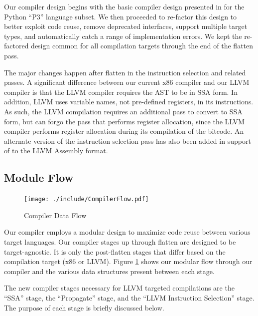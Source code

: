 \documentclass[11pt,twocolumn]{article}
\begin{document}
Our compiler design begins with the basic compiler design presented in
\cite{siek-chang} for the Python ``P3'' language subset.  We then
proceeded to re-factor this design to better exploit code reuse,
remove deprecated interfaces, support multiple target types, and
automatically catch a range of implementation errors. We kept the re-factored design common for all compilation targets
through the end of the flatten pass.

The major changes happen after flatten in the instruction selection
and related passes. A significant difference between our current x86
compiler and our LLVM compiler is that the LLVM compiler requires the
AST to be in SSA form. In addition, LLVM uses variable names, not
pre-defined registers, in its instructions. As such, the LLVM
compilation requires an additional pass to convert to SSA form, but
can forgo the pass that performs register allocation, since the LLVM compiler performs register allocation during its compilation of the bitcode. An alternate version of the instruction selection pass has also been added in support of to the LLVM Assembly format.

\subsection{Module Flow}
\label{sec:ModuleFlow}

\begin{figure}[htb]
   \centering
   \texttt{[image: ./include/CompilerFlow.pdf]}
   \caption{Compiler Data Flow}
   \label{fig:CompilerFlow}
\end{figure}

Our compiler employs a modular design to maximize code reuse between
various target languages.  Our compiler stages up through flatten are
designed to be target-agnostic. It is only the post-flatten stages
that differ based on the compilation target (x86 or LLVM). Figure
\ref{fig:CompilerFlow} shows our modular flow through our compiler and
the various data structures present between each stage.

The new compiler stages necessary for LLVM targeted compilations are
the ``SSA'' stage, the ``Propagate'' stage, and the ``LLVM Instruction
Selection'' stage. The purpose of each stage is briefly discussed
below.
\end{document}

